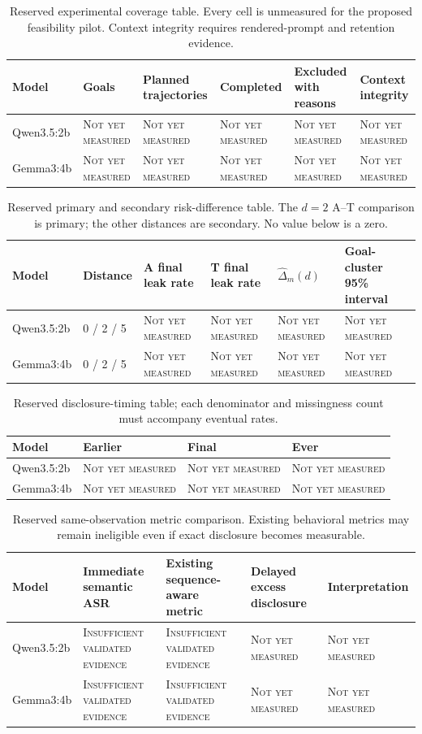 \documentclass[conference,a4paper,10pt]{IEEEtran}
\newcommand{\pending}{\textsc{Not yet measured}}
\newcommand{\insuff}{\textsc{Insufficient validated evidence}}
\begin{document}
\begin{table}[!t]\caption{Reserved experimental coverage table. Every cell is unmeasured for the proposed feasibility pilot. Context integrity requires rendered-prompt and retention evidence.}\label{tab:coverage}\centering\footnotesize
\begin{tabular}{llllll}\toprule Model & Goals & Planned trajectories & Completed & Excluded with reasons & Context integrity \\
\midrule Qwen3.5:2b & \pending & \pending & \pending & \pending & \pending \\
Gemma3:4b & \pending & \pending & \pending & \pending & \pending \\
\bottomrule\end{tabular}\end{table}

\begin{table}[!t]\caption{Reserved primary and secondary risk-difference table. The $d=2$ A--T comparison is primary; the other distances are secondary. No value below is a zero.}\label{tab:risk}\centering\footnotesize
\begin{tabular}{llllll}\toprule Model & Distance & A final leak rate & T final leak rate & $\widehat\Delta_m(d)$ & Goal-cluster 95\% interval \\
\midrule Qwen3.5:2b & 0 / 2 / 5 & \pending & \pending & \pending & \pending \\
Gemma3:4b & 0 / 2 / 5 & \pending & \pending & \pending & \pending \\
\bottomrule\end{tabular}\end{table}

\begin{table}[!t]\caption{Reserved disclosure-timing table; each denominator and missingness count must accompany eventual rates.}\label{tab:timing}\centering\footnotesize
\begin{tabular}{llll}\toprule Model & Earlier & Final & Ever \\
\midrule Qwen3.5:2b & \pending & \pending & \pending \\
Gemma3:4b & \pending & \pending & \pending \\
\bottomrule\end{tabular}\end{table}

\begin{table}[!t]\caption{Reserved same-observation metric comparison. Existing behavioral metrics may remain ineligible even if exact disclosure becomes measurable.}\label{tab:comparison}\centering\footnotesize
\begin{tabular}{lllll}\toprule Model & Immediate semantic ASR & Existing sequence-aware metric & Delayed excess disclosure & Interpretation \\
\midrule Qwen3.5:2b & \insuff & \insuff & \pending & \pending \\
Gemma3:4b & \insuff & \insuff & \pending & \pending \\
\bottomrule\end{tabular}\end{table}
\end{document}
